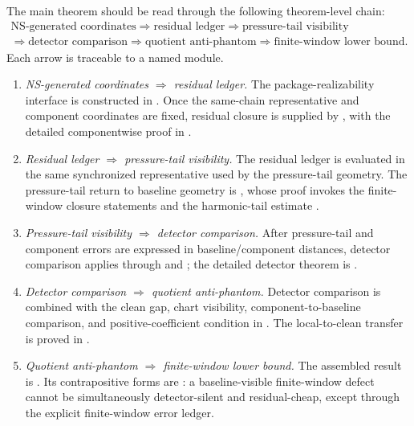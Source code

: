 \documentclass[11pt]{article}
\numberwithin{equation}{section}
\theoremstyle{definition}
\theoremstyle{remark}
\begin{document}
The main theorem should be read through the following theorem-level chain:
\[
\boxed{
\begin{gathered}
\text{NS-generated coordinates}
\Rightarrow
\text{residual ledger}
\Rightarrow
\text{pressure-tail visibility}\\
\Rightarrow
\text{detector comparison}
\Rightarrow
\text{quotient anti-phantom}
\Rightarrow
\text{finite-window lower bound}.
\end{gathered}
}
\]
Each arrow is traceable to a named module.
\begin{enumerate}[label=\textup{(\arabic*)},leftmargin=*]
\item \emph{NS-generated coordinates $\Rightarrow$ residual ledger.}
The package-realizability interface is constructed in .  Once the same-chain representative and component coordinates are fixed, residual closure is supplied by , with the detailed componentwise proof in .
\item \emph{Residual ledger $\Rightarrow$ pressure-tail visibility.}
The residual ledger is evaluated in the same synchronized representative used by the pressure-tail geometry.  The pressure-tail return to baseline geometry is , whose proof invokes the finite-window closure statements  and the harmonic-tail estimate .
\item \emph{Pressure-tail visibility $\Rightarrow$ detector comparison.}
After pressure-tail and component errors are expressed in baseline/component distances, detector comparison applies through  and ; the detailed detector theorem is .
\item \emph{Detector comparison $\Rightarrow$ quotient anti-phantom.}
Detector comparison is combined with the clean gap, chart visibility, component-to-baseline comparison, and positive-coefficient condition in .  The local-to-clean transfer is proved in .
\item \emph{Quotient anti-phantom $\Rightarrow$ finite-window lower bound.}
The assembled result is .  Its contrapositive forms are : a baseline-visible finite-window defect cannot be simultaneously detector-silent and residual-cheap, except through the explicit finite-window error ledger.
\end{enumerate}
\end{document}
